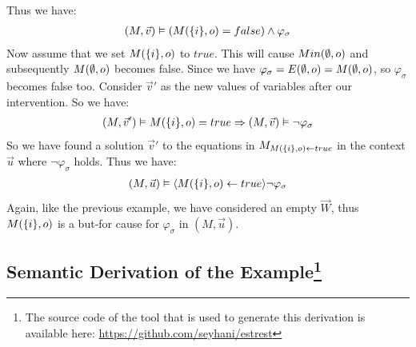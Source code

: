 \documentclass{article}
\begin{document}
\begin{example}
    Thus we have:
    \begin{align*}
        (M,\vec v) \vDash (M(\{i\},o) = false)  \wedge \varphi_{\sigma}
    \end{align*}
    Now assume that we set $M(\{i\},o)$ to $true$.
    This will cause $Min(\emptyset,o)$ and subsequently $M(\emptyset,o)$ becomes false.
    Since we have $\varphi_{\sigma} = E(\emptyset,o) = M(\emptyset,o)$, so 
    $\varphi_{\sigma}$ becomes false too.
    Consider $\vec v'$ as the new values of variables after our 
    intervention.
    So we have:
    \begin{align*}
        (M,\vec v')\vDash M(\{i\},o) = true 
        \Rightarrow
        (M,\vec v) \vDash \neg \varphi_{\sigma}
    \end{align*}
    So we have found a solution $\vec v'$ to the equations in 
    $M_{M(\{i\},o)\leftarrow true}$ in the context $\vec u$ where $\neg \varphi_{\sigma}$ holds. 
    Thus we have:
    \begin{align*}
        (M,\vec u) \vDash \langle M(\{i\},o) \leftarrow true \rangle \neg \varphi_{\sigma}
    \end{align*}
    Again, like the previous example, we have considered an empty $\vec W$, thus $M(\{i\},o)$ is a but-for cause for $\varphi_{\sigma}$ in $(M,\vec u)$.
\end{example}


\pagebreak
\begin{appendices}
    \section{Semantic Derivation of the Example\protect\footnote[1]
      {The source code of the tool that is used to
          generate this derivation is available here:
          \href{https://github.com/seyhani/estrest}
          {https://github.com/seyhani/estrest}
      }
     }
\end{appendices}
\end{document}
